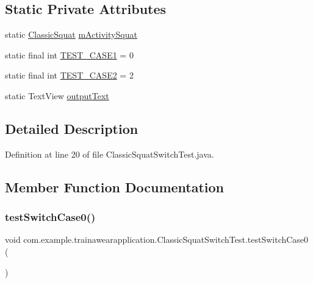 \subsection*{Static Private Attributes}
\begin{DoxyCompactItemize}
\item 
static \mbox{\hyperlink{classcom_1_1example_1_1trainawearapplication_1_1_classic_squat}{Classic\+Squat}} \mbox{\hyperlink{classcom_1_1example_1_1trainawearapplication_1_1_classic_squat_switch_test_a7a9e3a214af971f6f33cffabd8297902}{m\+Activity\+Squat}}
\item 
static final int \mbox{\hyperlink{classcom_1_1example_1_1trainawearapplication_1_1_classic_squat_switch_test_ad7aca3b01b79d4797ff05766d3e15059}{T\+E\+S\+T\+\_\+\+C\+A\+S\+E1}} = 0
\item 
static final int \mbox{\hyperlink{classcom_1_1example_1_1trainawearapplication_1_1_classic_squat_switch_test_adfafc37af9e307475f809327d404008d}{T\+E\+S\+T\+\_\+\+C\+A\+S\+E2}} = 2
\item 
static Text\+View \mbox{\hyperlink{classcom_1_1example_1_1trainawearapplication_1_1_classic_squat_switch_test_a5942ceb5c90ba3b912bb91020e3989ee}{output\+Text}}
\end{DoxyCompactItemize}


\subsection{Detailed Description}


Definition at line 20 of file Classic\+Squat\+Switch\+Test.\+java.



\subsection{Member Function Documentation}
\mbox{\label{classcom_1_1example_1_1trainawearapplication_1_1_classic_squat_switch_test_adca8046d4e95d7ca68bbc42ad0cf5d49}} 
\subsubsection{\texorpdfstring{testSwitchCase0()}{testSwitchCase0()}}
{\footnotesize\ttfamily void com.\+example.\+trainawearapplication.\+Classic\+Squat\+Switch\+Test.\+test\+Switch\+Case0 (\begin{DoxyParamCaption}{ }\end{DoxyParamCaption})}



